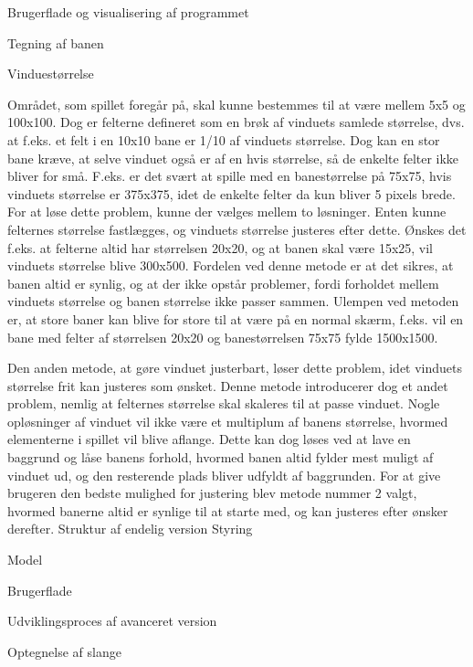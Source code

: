 Brugerflade og visualisering af programmet

Tegning af banen

Vinduestørrelse

Området, som spillet foregår på, skal kunne bestemmes til at være mellem 5x5 og 100x100. Dog er felterne defineret som en brøk af vinduets samlede størrelse, dvs. at f.eks. et felt i en 10x10 bane er 1/10 af vinduets størrelse. Dog kan en stor bane kræve, at selve vinduet også er af en hvis størrelse, så de enkelte felter ikke bliver for små. F.eks. er det svært at spille med en banestørrelse på 75x75, hvis vinduets størrelse er 375x375, idet de enkelte felter da kun bliver 5 pixels brede. For at løse dette problem, kunne der vælges mellem to løsninger. Enten kunne felternes størrelse fastlægges, og vinduets størrelse justeres efter dette. Ønskes det f.eks. at felterne altid har størrelsen 20x20, og at banen skal være 15x25, vil vinduets størrelse blive 300x500. Fordelen ved denne metode er at det sikres, at banen altid er synlig, og at der ikke opstår problemer, fordi forholdet mellem vinduets størrelse og banen størrelse ikke passer sammen. Ulempen ved metoden er, at store baner kan blive for store til at være på en normal skærm, f.eks. vil en bane med felter af størrelsen 20x20 og banestørrelsen 75x75 fylde 1500x1500.

Den anden metode, at gøre vinduet justerbart, løser dette problem, idet vinduets størrelse frit kan justeres som ønsket. Denne metode introducerer dog et andet problem, nemlig at felternes størrelse skal skaleres til at passe vinduet. Nogle opløsninger af vinduet vil ikke være et multiplum af banens størrelse, hvormed elementerne i spillet vil blive aflange. Dette kan dog løses ved at lave en baggrund og låse banens forhold, hvormed banen altid fylder mest muligt af vinduet ud, og den resterende plads bliver udfyldt af baggrunden.
For at give brugeren den bedste mulighed for justering blev metode nummer 2 valgt, hvormed banerne altid er synlige til at starte med, og kan justeres efter ønsker derefter.
Struktur af endelig version
Styring

Model

Brugerflade


Udviklingsproces  af avanceret version

Optegnelse af slange

